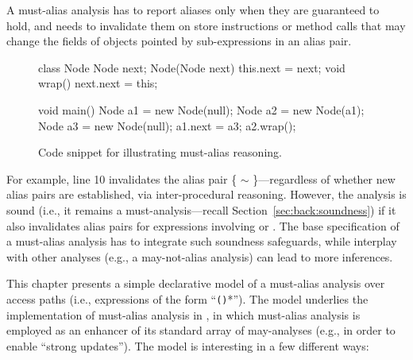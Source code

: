 A must-alias analysis has to report aliases only when they are guaranteed to hold, and needs to invalidate them on store instructions or method calls that may change the fields of objects pointed by sub-expressions in an alias pair.

\begin{figure}[htb!p]
\begin{javacode}
class Node {
	Node next;
	Node(Node next) { this.next = next; }
	void wrap() { next.next = this; }
}

void main() {
	Node a1 = new Node(null);
	Node a2 = new Node(a1);
	Node a3 = new Node(null);
	a1.next = a3;
	a2.wrap();
}
\end{javacode}
\caption{Code snippet for illustrating must-alias reasoning.}
\label{fig:must-logic:snippet}
\end{figure}

For example, line 10 invalidates the alias pair \{ $\sim$ \}---regardless of whether new alias pairs are established, via inter-procedural reasoning. However, the analysis is sound (i.e., it remains a must-analysis---recall Section~\ref{sec:back:soundness}) if it also invalidates alias pairs for expressions involving  or . The base specification of a must-alias analysis has to integrate such soundness safeguards, while interplay with other analyses (e.g., a may-not-alias analysis) can lead to more inferences.

This chapter presents a simple declarative model of a must-alias analysis over access paths (i.e., expressions of the form ``\texttt{()}*''). The model underlies the implementation of must-alias analysis in \doop{}, in which must-alias analysis is employed as an enhancer of its standard array of may-analyses (e.g., in order to enable ``strong updates''). The model is interesting in a few different ways:

